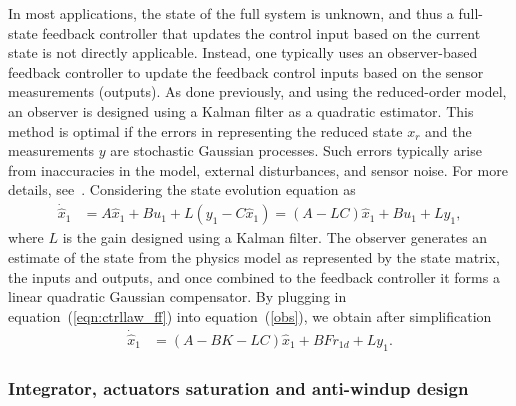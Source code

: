 \documentclass[12pt]{iopart}
\begin{document}
In most applications, the state of the full system is unknown, and thus a full-state feedback controller that updates the control input based on the current state is not directly applicable. Instead, one typically uses an observer-based feedback controller to update the feedback control inputs based on the sensor measurements (outputs).
As done previously, and using the reduced-order model, an observer is designed using a Kalman filter as a quadratic estimator. This method is optimal if the errors in representing the reduced state $x_r$ and the measurements $y$ are stochastic Gaussian processes. 
Such errors typically arise from inaccuracies in the model, external disturbances, and sensor noise. For more details, see~\cite{SandP, AandM, Stengel}. 
Considering the state evolution equation as
\begin{eqnarray}
 \dot{\hat{x}}_1 &=  A \hat{x}_1 + B u_{1} + L (y_1 - C \hat{x}_1) =   (A- L C) \hat{x}_1 + B u_{1} + L y_1,
 \label{obs}
\end{eqnarray}
 where $L$ is the gain designed using a Kalman filter.    
 The observer generates an estimate of the state from the physics model as represented by the state matrix, the inputs and outputs, and once combined to the feedback controller it forms a linear quadratic Gaussian compensator.
By plugging in equation~(\ref{eqn:ctrllaw_ff}) into equation~(\ref{obs}), we obtain after simplification
\begin{eqnarray}
      \dot{\hat{x}}_1 &=  (A- B K  -L C) \hat{x}_1 + B F r_{1d} + L y_1.
\end{eqnarray}


\subsubsection{Integrator, actuators saturation and anti-windup design} 
\end{document}
